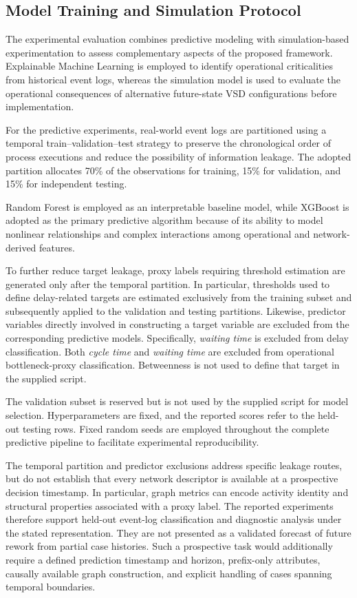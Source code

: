 \documentclass[pdflatex,iicol,Numbered,sn-basic]{sn-jnl}
\begin{document}
\subsection{Model Training and Simulation Protocol}
\label{subsec:training_protocol}

The experimental evaluation combines predictive modeling with simulation-based experimentation to assess complementary aspects of the proposed framework. Explainable Machine Learning is employed to identify operational criticalities from historical event logs, whereas the simulation model is used to evaluate the operational consequences of alternative future-state VSD configurations before implementation.

For the predictive experiments, real-world event logs are partitioned using a temporal train--validation--test strategy to preserve the chronological order of process executions and reduce the possibility of information leakage. The adopted partition allocates 70\% of the observations for training, 15\% for validation, and 15\% for independent testing.

Random Forest is employed as an interpretable baseline model, while XGBoost is adopted as the primary predictive algorithm because of its ability to model nonlinear relationships and complex interactions among operational and network-derived features.

To further reduce target leakage, proxy labels requiring threshold estimation are generated only after the temporal partition. In particular, thresholds used to define delay-related targets are estimated exclusively from the training subset and subsequently applied to the validation and testing partitions. Likewise, predictor variables directly involved in constructing a target variable are excluded from the corresponding predictive models. Specifically, \textit{waiting time} is excluded from delay classification. Both \textit{cycle time} and \textit{waiting time} are excluded from operational bottleneck-proxy classification. Betweenness is not used to define that target in the supplied script.

The validation subset is reserved but is not used by the supplied script for model selection. Hyperparameters are fixed, and the reported scores refer to the held-out testing rows. Fixed random seeds are employed throughout the complete predictive pipeline to facilitate experimental reproducibility.

The temporal partition and predictor exclusions address specific leakage routes, but do not establish that every network descriptor is available at a prospective decision timestamp. In particular, graph metrics can encode activity identity and structural properties associated with a proxy label. The reported experiments therefore support held-out event-log classification and diagnostic analysis under the stated representation. They are not presented as a validated forecast of future rework from partial case histories. Such a prospective task would additionally require a defined prediction timestamp and horizon, prefix-only attributes, causally available graph construction, and explicit handling of cases spanning temporal boundaries.
\end{document}
